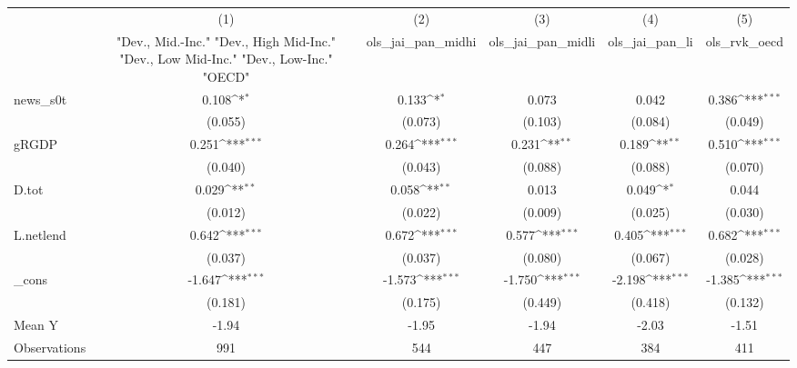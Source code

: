 {
\def\sym#1{\ifmmode^{#1}\else\(^{#1}\)\fi}
\begin{tabular}{l*{5}{c}}
\toprule
            &\multicolumn{1}{c}{(1)}&\multicolumn{1}{c}{(2)}&\multicolumn{1}{c}{(3)}&\multicolumn{1}{c}{(4)}&\multicolumn{1}{c}{(5)}\\
            &\multicolumn{1}{c}{ "Dev., Mid.-Inc." "Dev., High Mid-Inc." "Dev., Low Mid-Inc." "Dev., Low-Inc." "OECD" }&\multicolumn{1}{c}{ols\_jai\_pan\_midhi}&\multicolumn{1}{c}{ols\_jai\_pan\_midli}&\multicolumn{1}{c}{ols\_jai\_pan\_li}&\multicolumn{1}{c}{ols\_rvk\_oecd}\\
\midrule
news\_s0t    &       0.108\sym{*}  &       0.133\sym{*}  &       0.073         &       0.042         &       0.386\sym{***}\\
            &     (0.055)         &     (0.073)         &     (0.103)         &     (0.084)         &     (0.049)         \\
\addlinespace
gRGDP       &       0.251\sym{***}&       0.264\sym{***}&       0.231\sym{**} &       0.189\sym{**} &       0.510\sym{***}\\
            &     (0.040)         &     (0.043)         &     (0.088)         &     (0.088)         &     (0.070)         \\
\addlinespace
D.tot       &       0.029\sym{**} &       0.058\sym{**} &       0.013         &       0.049\sym{*}  &       0.044         \\
            &     (0.012)         &     (0.022)         &     (0.009)         &     (0.025)         &     (0.030)         \\
\addlinespace
L.netlend   &       0.642\sym{***}&       0.672\sym{***}&       0.577\sym{***}&       0.405\sym{***}&       0.682\sym{***}\\
            &     (0.037)         &     (0.037)         &     (0.080)         &     (0.067)         &     (0.028)         \\
\addlinespace
\_cons      &      -1.647\sym{***}&      -1.573\sym{***}&      -1.750\sym{***}&      -2.198\sym{***}&      -1.385\sym{***}\\
            &     (0.181)         &     (0.175)         &     (0.449)         &     (0.418)         &     (0.132)         \\
\midrule
Mean Y      &       -1.94         &       -1.95         &       -1.94         &       -2.03         &       -1.51         \\
Observations&         991         &         544         &         447         &         384         &         411         \\
\bottomrule
\end{tabular}
}

